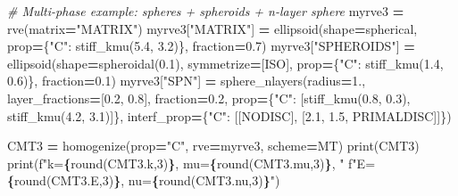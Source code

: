 \documentclass[
  a4paper,
  numbers=noendperiod,
  DIV=12]{scrreprt}
\newenvironment{Shaded}{\begin{snugshade}}{\end{snugshade}}
\newcommand{\BuiltInTok}[1]{#1}
\newcommand{\CommentTok}[1]{\textcolor[rgb]{0.56,0.35,0.01}{\textit{#1}}}
\newcommand{\DecValTok}[1]{\textcolor[rgb]{0.00,0.00,0.81}{#1}}
\newcommand{\FloatTok}[1]{\textcolor[rgb]{0.00,0.00,0.81}{#1}}
\newcommand{\NormalTok}[1]{#1}
\newcommand{\OperatorTok}[1]{\textcolor[rgb]{0.81,0.36,0.00}{\textbf{#1}}}
\newcommand{\SpecialCharTok}[1]{\textcolor[rgb]{0.81,0.36,0.00}{\textbf{#1}}}
\newcommand{\SpecialStringTok}[1]{\textcolor[rgb]{0.31,0.60,0.02}{#1}}
\newcommand{\StringTok}[1]{\textcolor[rgb]{0.31,0.60,0.02}{#1}}
\begin{document}
\begin{Shaded}
\begin{Highlighting}[]
\CommentTok{\# Multi{-}phase example: spheres + spheroids + n{-}layer sphere}
\NormalTok{myrve3 }\OperatorTok{=}\NormalTok{ rve(matrix}\OperatorTok{=}\StringTok{"MATRIX"}\NormalTok{)}
\NormalTok{myrve3[}\StringTok{"MATRIX"}\NormalTok{]   }\OperatorTok{=}\NormalTok{ ellipsoid(shape}\OperatorTok{=}\NormalTok{spherical,}
\NormalTok{    prop}\OperatorTok{=}\NormalTok{\{}\StringTok{"C"}\NormalTok{: stiff\_kmu(}\FloatTok{5.4}\NormalTok{, }\FloatTok{3.2}\NormalTok{)\}, fraction}\OperatorTok{=}\FloatTok{0.7}\NormalTok{)}
\NormalTok{myrve3[}\StringTok{"SPHEROIDS"}\NormalTok{] }\OperatorTok{=}\NormalTok{ ellipsoid(shape}\OperatorTok{=}\NormalTok{spheroidal(}\FloatTok{0.1}\NormalTok{),}
\NormalTok{    symmetrize}\OperatorTok{=}\NormalTok{[ISO], prop}\OperatorTok{=}\NormalTok{\{}\StringTok{"C"}\NormalTok{: stiff\_kmu(}\FloatTok{1.4}\NormalTok{, }\FloatTok{0.6}\NormalTok{)\}, fraction}\OperatorTok{=}\FloatTok{0.1}\NormalTok{)}
\NormalTok{myrve3[}\StringTok{"SPN"}\NormalTok{]      }\OperatorTok{=}\NormalTok{ sphere\_nlayers(radius}\OperatorTok{=}\FloatTok{1.}\NormalTok{,}
\NormalTok{    layer\_fractions}\OperatorTok{=}\NormalTok{[}\FloatTok{0.2}\NormalTok{, }\FloatTok{0.8}\NormalTok{], fraction}\OperatorTok{=}\FloatTok{0.2}\NormalTok{,}
\NormalTok{    prop}\OperatorTok{=}\NormalTok{\{}\StringTok{"C"}\NormalTok{: [stiff\_kmu(}\FloatTok{0.8}\NormalTok{, }\FloatTok{0.3}\NormalTok{), stiff\_kmu(}\FloatTok{4.2}\NormalTok{, }\FloatTok{3.1}\NormalTok{)]\},}
\NormalTok{    interf\_prop}\OperatorTok{=}\NormalTok{\{}\StringTok{"C"}\NormalTok{: [[NODISC], [}\FloatTok{2.1}\NormalTok{, }\FloatTok{1.5}\NormalTok{, PRIMALDISC]]\})}

\NormalTok{CMT3 }\OperatorTok{=}\NormalTok{ homogenize(prop}\OperatorTok{=}\StringTok{"C"}\NormalTok{, rve}\OperatorTok{=}\NormalTok{myrve3, scheme}\OperatorTok{=}\NormalTok{MT)}
\BuiltInTok{print}\NormalTok{(CMT3)}
\BuiltInTok{print}\NormalTok{(}\SpecialStringTok{f"k=}\SpecialCharTok{\{}\BuiltInTok{round}\NormalTok{(CMT3.k,}\DecValTok{3}\NormalTok{)}\SpecialCharTok{\}}\SpecialStringTok{, mu=}\SpecialCharTok{\{}\BuiltInTok{round}\NormalTok{(CMT3.mu,}\DecValTok{3}\NormalTok{)}\SpecialCharTok{\}}\SpecialStringTok{, "}
      \SpecialStringTok{f"E=}\SpecialCharTok{\{}\BuiltInTok{round}\NormalTok{(CMT3.E,}\DecValTok{3}\NormalTok{)}\SpecialCharTok{\}}\SpecialStringTok{, nu=}\SpecialCharTok{\{}\BuiltInTok{round}\NormalTok{(CMT3.nu,}\DecValTok{3}\NormalTok{)}\SpecialCharTok{\}}\SpecialStringTok{"}\NormalTok{)}
\end{Highlighting}
\end{Shaded}
\end{document}
